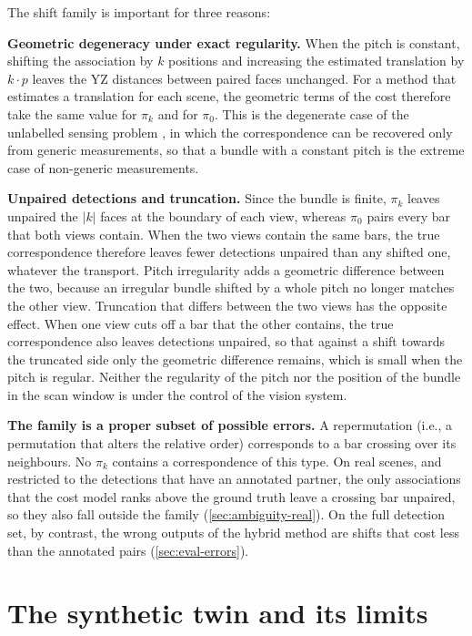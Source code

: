 \documentclass[a4paper, 12pt, twoside]{book}
\newcommand{\citev}[1]{\citeauthor{#1} \citeyear{#1} \cite{#1}}
\begin{document}
The shift family is important for three reasons:

\textbf{Geometric degeneracy under exact regularity.} When the pitch is constant, shifting the association by $k$ positions and increasing the estimated translation by $k \cdot p$ leaves the YZ distances between paired faces unchanged. For a method that estimates a translation for each scene, the geometric terms of the cost therefore take the same value for $\pi_k$ and for $\pi_0$. This is the degenerate case of the unlabelled sensing problem \citev{unnikrishnan2018}, in which the correspondence can be recovered only from generic measurements, so that a bundle with a constant pitch is the extreme case of non-generic measurements.

\textbf{Unpaired detections and truncation.} Since the bundle is finite, $\pi_k$ leaves unpaired the $\vert{}k\vert{}$ faces at the boundary of each view, whereas $\pi_0$ pairs every bar that both views contain. When the two views contain the same bars, the true correspondence therefore leaves fewer detections unpaired than any shifted one, whatever the transport. Pitch irregularity adds a geometric difference between the two, because an irregular bundle shifted by a whole pitch no longer matches the other view. Truncation that differs between the two views has the opposite effect. When one view cuts off a bar that the other contains, the true correspondence also leaves detections unpaired, so that against a shift towards the truncated side only the geometric difference remains, which is small when the pitch is regular. Neither the regularity of the pitch nor the position of the bundle in the scan window is under the control of the vision system.

\textbf{The family is a proper subset of possible errors.} A repermutation (i.e., a permutation that alters the relative order) corresponds to a bar crossing over its neighbours. No $\pi_k$ contains a correspondence of this type. On real scenes, and restricted to the detections that have an annotated partner, the only associations that the cost model ranks above the ground truth leave a crossing bar unpaired, so they also fall outside the family (\cref{sec:ambiguity-real}). On the full detection set, by contrast, the wrong outputs of the hybrid method are shifts that cost less than the annotated pairs (\cref{sec:eval-errors}).

\section{The synthetic twin and its limits}
\label{sec:setting-twin}
\end{document}
